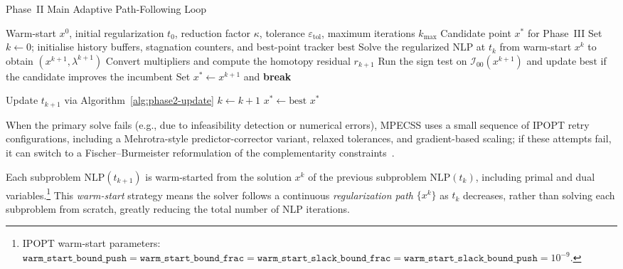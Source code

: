 \begin{algorithm}[htbp]
\caption{Phase~II Main Adaptive Path-Following Loop}
\label{alg:phase2-main}
\begin{algorithmic}[1]
\Require Warm-start $x^0$, initial regularization $t_0$, reduction factor $\kappa$, tolerance $\varepsilon_{\mathrm{tol}}$, maximum iterations $k_{\max}$
\Ensure Candidate point $x^*$ for Phase~III
\State Set $k \gets 0$; initialise history buffers, stagnation counters, and best-point tracker $\mathrm{best}$
  \State Solve the regularized NLP at $t_k$ from warm-start $x^k$ to obtain $(x^{k+1},\lambda^{k+1})$
  \State Convert multipliers and compute the homotopy residual $r_{k+1}$
  \State Run the sign test on $\mathcal{I}_{00}(x^{k+1})$ and update $\mathrm{best}$ if the candidate improves the incumbent
    \State Set $x^* \gets x^{k+1}$ and \textbf{break}
  \EndIf

  \State Update $t_{k+1}$ via Algorithm~\ref{alg:phase2-update}
  \State $k \gets k+1$
\EndWhile
{}
  \State $x^* \gets \mathrm{best}$
\EndIf
\State \Return $x^*$
\end{algorithmic}
\end{algorithm}

When the primary solve fails (e.g., due to infeasibility detection
or numerical errors), MPECSS uses a small sequence of IPOPT retry configurations, including a Mehrotra-style predictor-corrector variant, relaxed tolerances, and gradient-based scaling; if these attempts fail, it can switch to a Fischer--Burmeister reformulation of the complementarity constraints~\cite{WachterBiegler2006,Fischer1992,Kanzow1996}.

Each subproblem $\text{NLP}(t_{k+1})$ is warm-started from the solution
$x^k$ of the previous subproblem $\text{NLP}(t_k)$, including primal
and dual variables.\footnote{%
  IPOPT warm-start parameters: $\texttt{warm\_start\_bound\_push} =
  \texttt{warm\_start\_bound\_frac} = \texttt{warm\_start\_slack\_bound\_frac}
  = \texttt{warm\_start\_slack\_bound\_push} = 10^{-9}$.}
This \emph{warm-start} strategy means the solver follows a continuous
\emph{regularization path} $\{x^k\}$ as $t_k$ decreases, rather than
solving each subproblem from scratch, greatly reducing the total number
of NLP iterations.


